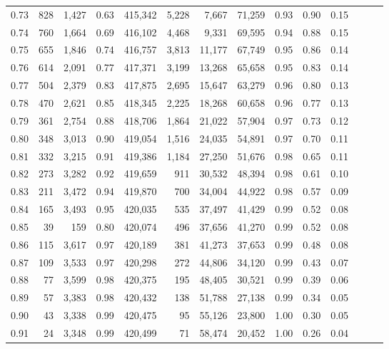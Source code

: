 \begin{tabular}{rrrrrrrrrrrrrr}
0.73 &    828 &  1,427 &  0.63 &  415,342 &    5,228 &   7,667 &  71,259 &  0.93 &  0.90 &      0.15 \\
0.74 &    760 &  1,664 &  0.69 &  416,102 &    4,468 &   9,331 &  69,595 &  0.94 &  0.88 &      0.15 \\
0.75 &    655 &  1,846 &  0.74 &  416,757 &    3,813 &  11,177 &  67,749 &  0.95 &  0.86 &      0.14 \\
0.76 &    614 &  2,091 &  0.77 &  417,371 &    3,199 &  13,268 &  65,658 &  0.95 &  0.83 &      0.14 \\
0.77 &    504 &  2,379 &  0.83 &  417,875 &    2,695 &  15,647 &  63,279 &  0.96 &  0.80 &      0.13 \\
0.78 &    470 &  2,621 &  0.85 &  418,345 &    2,225 &  18,268 &  60,658 &  0.96 &  0.77 &      0.13 \\
0.79 &    361 &  2,754 &  0.88 &  418,706 &    1,864 &  21,022 &  57,904 &  0.97 &  0.73 &      0.12 \\
0.80 &    348 &  3,013 &  0.90 &  419,054 &    1,516 &  24,035 &  54,891 &  0.97 &  0.70 &      0.11 \\
0.81 &    332 &  3,215 &  0.91 &  419,386 &    1,184 &  27,250 &  51,676 &  0.98 &  0.65 &      0.11 \\
0.82 &    273 &  3,282 &  0.92 &  419,659 &      911 &  30,532 &  48,394 &  0.98 &  0.61 &      0.10 \\
0.83 &    211 &  3,472 &  0.94 &  419,870 &      700 &  34,004 &  44,922 &  0.98 &  0.57 &      0.09 \\
0.84 &    165 &  3,493 &  0.95 &  420,035 &      535 &  37,497 &  41,429 &  0.99 &  0.52 &      0.08 \\
0.85 &     39 &    159 &  0.80 &  420,074 &      496 &  37,656 &  41,270 &  0.99 &  0.52 &      0.08 \\
0.86 &    115 &  3,617 &  0.97 &  420,189 &      381 &  41,273 &  37,653 &  0.99 &  0.48 &      0.08 \\
0.87 &    109 &  3,533 &  0.97 &  420,298 &      272 &  44,806 &  34,120 &  0.99 &  0.43 &      0.07 \\
0.88 &     77 &  3,599 &  0.98 &  420,375 &      195 &  48,405 &  30,521 &  0.99 &  0.39 &      0.06 \\
0.89 &     57 &  3,383 &  0.98 &  420,432 &      138 &  51,788 &  27,138 &  0.99 &  0.34 &      0.05 \\
0.90 &     43 &  3,338 &  0.99 &  420,475 &       95 &  55,126 &  23,800 &  1.00 &  0.30 &      0.05 \\
0.91 &     24 &  3,348 &  0.99 &  420,499 &       71 &  58,474 &  20,452 &  1.00 &  0.26 &      0.04 \\

\end{tabular}
